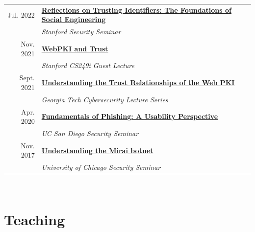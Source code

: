 \documentclass[10pt,singlecolumn]{article} %
\begin{document}
\begin{tabular}{rl}

Jul. 2022 & \textbf{\href{https://zanema.com/slides/stanford_se.pdf}{Reflections on Trusting Identifiers: The Foundations of Social Engineering}}\\
& \emph{Stanford Security Seminar}\\

Nov. 2021 & \textbf{\href{https://zanema.com/slides/CS249i-WebPKI.pdf}{WebPKI and Trust}}\\
& \emph{Stanford CS249i Guest Lecture}\\

Sept. 2021 & \textbf{\href{https://zanema.com/slides/gt_lecture_trust.pdf}{Understanding the Trust Relationships of the Web PKI}}\\
& \emph{Georgia Tech Cybersecurity Lecture Series}\\

Apr. 2020 & \textbf{\href{https://zanema.com/slides/ucsd_phishing.pdf}{Fundamentals of Phishing: A Usability Perspective}}\\
& \emph{UC San Diego Security Seminar}\\



Nov. 2017 & \textbf{\href{https://zanema.com/slides/uchicago_mirai.pdf}{Understanding the Mirai botnet}}\\
& \emph{University of Chicago Security Seminar}\\
\end{tabular} \\




\section{Teaching} 
\end{document}
